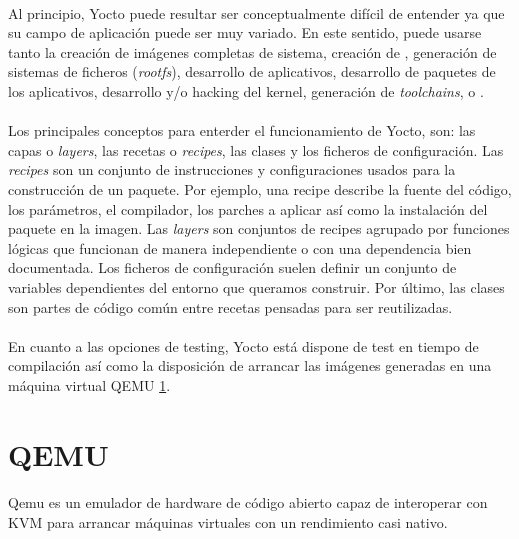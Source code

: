 \paragraph{}Al principio, Yocto puede resultar ser conceptualmente difícil de entender
ya que su campo de aplicación puede ser muy variado. En este sentido, puede usarse tanto
la creación de imágenes completas de sistema, creación de \emph{}, generación
de sistemas de ficheros (\emph{rootfs}), desarrollo de aplicativos, desarrollo de paquetes
de los aplicativos, desarrollo y/o hacking del kernel, generación de  \emph{toolchains},
 o .

\paragraph{\label{layers} \label{recipes}}Los principales conceptos para enterder el
funcionamiento de Yocto, son:
las capas o \emph{layers}, las recetas o \emph{recipes}, las clases y los ficheros de
configuración. Las \emph{recipes} son un conjunto de instrucciones y configuraciones
usados para la construcción de un paquete. Por ejemplo, una recipe describe la fuente
del código, los parámetros, el compilador, los parches a aplicar así como la instalación
del paquete en la imagen. Las \emph{layers} son conjuntos de recipes agrupado por
funciones lógicas que funcionan de manera independiente o con una dependencia bien
documentada. Los ficheros de configuración suelen definir un conjunto de variables
dependientes del entorno que queramos construir. Por último, las clases son partes de
código común entre recetas pensadas para ser reutilizadas.

\paragraph{}En cuanto a las opciones de testing, Yocto está dispone de test en tiempo
de compilación así como la disposición de arrancar las imágenes generadas en una máquina
virtual QEMU \ref{sec:qemu}.

\section{QEMU}\label{sec:qemu}

\paragraph{} Qemu es un emulador de hardware de código abierto capaz de interoperar con
\gls{KVM} para arrancar máquinas virtuales con un rendimiento casi nativo.
\cite{qemu}

